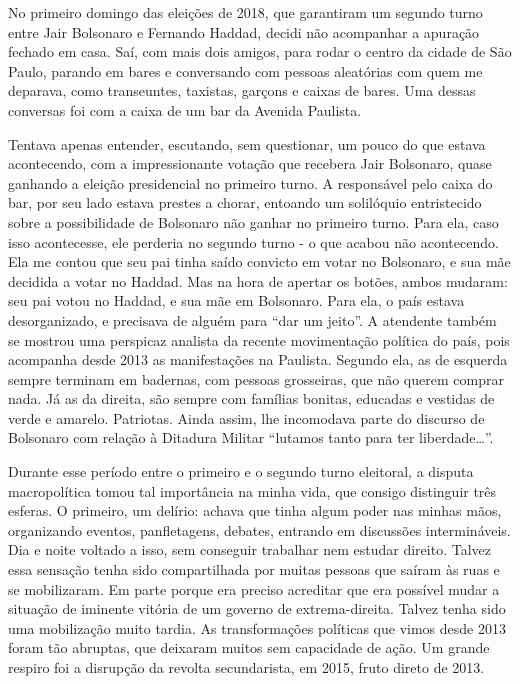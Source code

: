 No primeiro domingo das eleições de 2018, que garantiram um segundo
turno entre Jair Bolsonaro e Fernando Haddad, decidi não acompanhar a
apuração fechado em casa. Saí, com mais dois amigos, para rodar o centro
da cidade de São Paulo, parando em bares e conversando com pessoas
aleatórias com quem me deparava, como transeuntes, taxistas, garçons e
caixas de bares. Uma dessas conversas foi com a caixa de um bar da
Avenida Paulista.

Tentava apenas entender, escutando, sem questionar, um pouco do que
estava acontecendo, com a impressionante votação que recebera Jair
Bolsonaro, quase ganhando a eleição presidencial no primeiro turno. A
responsável pelo caixa do bar, por seu lado estava prestes a chorar,
entoando um solilóquio entristecido sobre a possibilidade de Bolsonaro
não ganhar no primeiro turno. Para ela, caso isso acontecesse, ele
perderia no segundo turno - o que acabou não acontecendo. Ela me contou
que seu pai tinha saído convicto em votar no Bolsonaro, e sua mãe
decidida a votar no Haddad. Mas na hora de apertar os botões, ambos
mudaram: seu pai votou no Haddad, e sua mãe em Bolsonaro. Para ela, o
país estava desorganizado, e precisava de alguém para ``dar um jeito''.
A atendente também se mostrou uma perspicaz analista da recente
movimentação política do país, pois acompanha desde 2013 as
manifestações na Paulista. Segundo ela, as de esquerda sempre terminam
em badernas, com pessoas grosseiras, que não querem comprar nada. Já as
da direita, são sempre com famílias bonitas, educadas e vestidas de
verde e amarelo. Patriotas. Ainda assim, lhe incomodava parte do
discurso de Bolsonaro com relação à Ditadura Militar ``lutamos tanto
para ter liberdade\ldots{}''.

Durante esse período entre o primeiro e o segundo turno eleitoral, a
disputa macropolítica tomou tal importância na minha vida, que consigo
distinguir três esferas. O primeiro, um delírio: achava que tinha algum
poder nas minhas mãos, organizando eventos, panfletagens, debates,
entrando em discussões intermináveis. Dia e noite voltado a isso, sem
conseguir trabalhar nem estudar direito. Talvez essa sensação tenha sido
compartilhada por muitas pessoas que saíram às ruas e se mobilizaram. Em
parte porque era preciso acreditar que era possível mudar a situação de
iminente vitória de um governo de extrema-direita. Talvez tenha sido uma
mobilização muito tardia. As transformações políticas que vimos desde
2013 foram tão abruptas, que deixaram muitos sem capacidade de ação. Um
grande respiro foi a disrupção da revolta secundarista, em 2015, fruto
direto de 2013.

